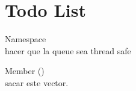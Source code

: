 \chapter{Todo List}
\hypertarget{todo}{}\label{todo}

\begin{DoxyRefList}
\item[Namespace \doxylink{namespace_ragot}{Ragot} ]\hfill \\
\label{todo__todo000002}%
%
hacer que la queue sea thread safe  
\item[Member \doxylink{class_ragot_1_1_scene_a49a97f3f10afee472d2eb0c21fc90542}{Ragot\+::Scene\+::collect\+\_\+components} ()]\hfill \\
\label{todo__todo000001}%
%
sacar este vector. 
\end{DoxyRefList}
